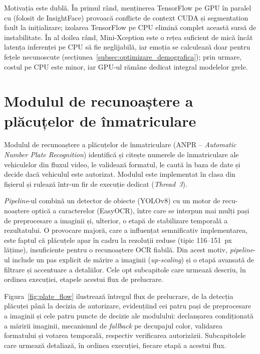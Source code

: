 \documentclass[../../main.tex]{subfiles}
\begin{document}
Motivația este dublă. În primul rând, menținerea TensorFlow pe GPU în paralel cu
 (folosit de InsightFace) provoacă conflicte de context CUDA și
segmentation fault la inițializare; izolarea TensorFlow pe CPU elimină complet această
sursă de instabilitate. În al doilea rând, Mini-Xception este o rețea suficient de mică
încât latența inferenței pe CPU să fie neglijabilă, iar emoția se calculează doar pentru
fețele necunoscute (secțiunea~\ref{subsec:optimizare_demografica}); prin urmare, costul pe
CPU este minor, iar GPU-ul rămâne dedicat integral modelelor grele.

\section{Modulul de recunoaștere a plăcuțelor de înmatriculare}
\label{sec:modul_placute}

Modulul de recunoaștere a plăcuțelor de înmatriculare (ANPR -- \textit{Automatic Number
Plate Recognition}) identifică și citește numerele de înmatriculare ale vehiculelor din
fluxul video, le validează formatul, le caută în baza de date și decide dacă vehiculul
este autorizat. Modulul este implementat în clasa 
din fișierul  \linebreak {} și rulează într-un fir de
execuție dedicat (\textit{Thread~3}).

\emph{Pipeline}-ul combină un detector de obiecte (YOLOv8) cu un motor de recu-noaștere optică a caracterelor (EasyOCR), între care se interpun mai mulți pași de preprocesare a imaginii și, ulterior, o etapă de stabilizare temporală a rezultatului. O provocare majoră, care a influențat semnificativ implementarea, este faptul că plăcuțele apar în cadru la rezoluții reduse (tipic 116--151~px lățime), insuficiente pentru o recunoaștere OCR fiabilă. Din acest motiv, \emph{pipeline}-ul include un pas explicit de mărire a imaginii (\emph{up-scaling}) și o etapă avansată de filtrare și accentuare a detaliilor. Cele opt subcapitole care urmează descriu, în ordinea execuției, etapele acestui flux de prelucrare.

Figura~\ref{fig:plate_flow} ilustrează întregul flux de prelucrare, de la detecția plăcuței până la decizia de autorizare, evidențiind cei patru pași de preprocesare a imaginii și cele patru puncte de decizie ale modulului: declanșarea condiționată a măririi imaginii, mecanismul de \emph{fallback} pe decupajul color, validarea formatului și votarea temporală, respectiv verificarea autorizării. Subcapitolele care urmează detaliază, în ordinea execuției, fiecare etapă a acestui flux.
\end{document}
